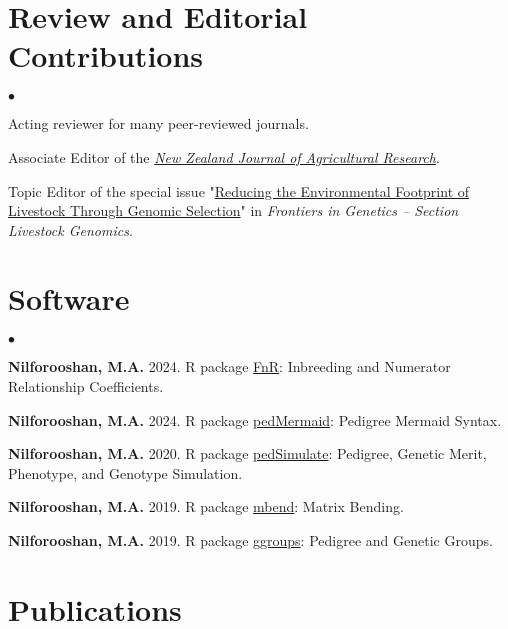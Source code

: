 \documentclass[margin,line]{res}
\newenvironment{list2}{
  \begin{list}{$\bullet$}{%
    \setlength{\itemsep}{0in}
    \setlength{\parsep}{0in} \setlength{\parskip}{0in}
    \setlength{\topsep}{0in} \setlength{\partopsep}{0in}
    \setlength{\leftmargin}{0.2in}}}
  {\end{list}}
\begin{document}
\begin{resume}
  \section{\sc Review and Editorial Contributions}

  \begin{list2}
    \item Acting reviewer for many peer-reviewed journals.
    \item Associate Editor of the \textit{\href{https://www.tandfonline.com/journals/tnza20}{New Zealand Journal of Agricultural Research}}.
    \item Topic Editor of the special issue "\href{https://www.frontiersin.org/research-topics/24065/reducing-the-environmental-footprint-of-livestock-through-genomic-selection}{Reducing the Environmental Footprint of Livestock Through Genomic Selection}" in \textit{Frontiers in Genetics -- Section Livestock Genomics}.
  \end{list2}
  \section{\sc Software}

  \begin{list2}
    \item {\bf Nilforooshan, M.A.} 2024. R package \href{https://CRAN.R-project.org/package=FnR}{FnR}: Inbreeding and Numerator Relationship Coefficients. \\
    \item {\bf Nilforooshan, M.A.} 2024. R package \href{https://CRAN.R-project.org/package=pedMermaid}{pedMermaid}: Pedigree Mermaid Syntax. \\
    \item {\bf Nilforooshan, M.A.} 2020. R package \href{https://CRAN.R-project.org/package=pedSimulate}{pedSimulate}: Pedigree, Genetic Merit, Phenotype, and Genotype Simulation. \\
    \item {\bf Nilforooshan, M.A.} 2019. R package \href{https://CRAN.R-project.org/package=mbend}{mbend}: Matrix Bending. \\
    \item {\bf Nilforooshan, M.A.} 2019. R package \href{https://CRAN.R-project.org/package=ggroups}{ggroups}: Pedigree and Genetic Groups.
  \end{list2}
  \section{\sc Publications}
  

\end{resume}
\end{document}
